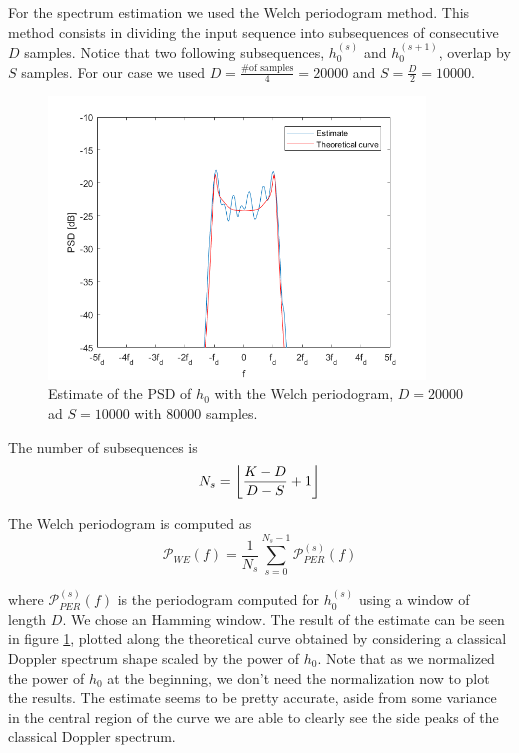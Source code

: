 \documentclass[a4paper,11.5pt]{article}
\DeclarePairedDelimiter{\floor}{\lfloor}{\rfloor}
\begin{document}
For the spectrum estimation we used the Welch periodogram method. This method consists in dividing the input sequence into subsequences of consecutive $D$ samples. Notice that two following subsequences, $h_0^{(s)}$ and $h_0^{(s+1)}$, overlap by $S$ samples. For our case we used $D =\frac{ \mbox{\# of samples}}{ 4}=20000$ and $S = \frac{D}{2}=10000$. \\


\begin{figure}[ht]
	\begin{center}    
		\includegraphics[width=10cm]{figs/PSD-est.png}
		\caption{Estimate of the PSD of $h_0$ with the Welch periodogram, $D=20000$ ad $S=10000$ with $80000$ samples.}
		\label{fig:PSD}
	\end{center}
\end{figure}
The number of subsequences is
\begin{equation}
N_s = \floor*{{\frac{K-D}{D-S}+1}}
\end{equation}

The Welch periodogram is computed as
\begin{equation}
\mathcal{P}_{WE}(f) = \frac{1}{N_s}\sum_{s=0}^{N_s-1}{\mathcal{P}}_{PER}^{(s)}(f)
\end{equation}

where ${\mathcal{P}}_{PER}^{(s)}(f)$ is the periodogram computed for $h_0^{(s)}$ using a window of length $D$. We chose an Hamming window. The result of the estimate can be seen in figure \ref{fig:PSD}, plotted along the theoretical curve obtained by considering a classical Doppler spectrum shape scaled by the power of $h_0$. Note that as we normalized the power of $h_0$ at the beginning, we don't need the normalization now to plot the results. The estimate seems to be pretty accurate, aside from some variance in the central region of the curve we are able to clearly see the side peaks of the classical Doppler spectrum.
\end{document}
